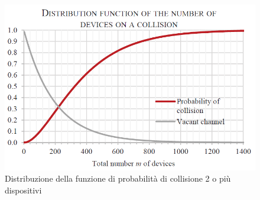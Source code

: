 \documentclass[a4paper]{report} %
\begin{document}
\begin{figure}
	\centering
	\includegraphics[scale=.5]{Immagini/DistribuzioneDiProb.png}
	
	\caption{Distribuzione della funzione di probabilità di collisione 2 o più dispositivi}
	\label{fig:dprob}
\end{figure}
\end{document}
